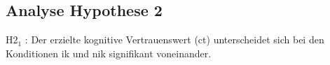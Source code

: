 \documentclass[a4paper,11pt]{article}%
\renewcommand{\\}{\vspace*{0.5\baselineskip} \newline}
\begin{document}
%
%
%
%
%

\newpage
	\subsection{Analyse Hypothese 2}
H2$_{1}$ : Der erzielte kognitive Vertrauenswert (\ac{ct}) unterscheidet sich bei den Konditionen \ac{ik} und \ac{nik} signifikant voneinander.
\end{document}

